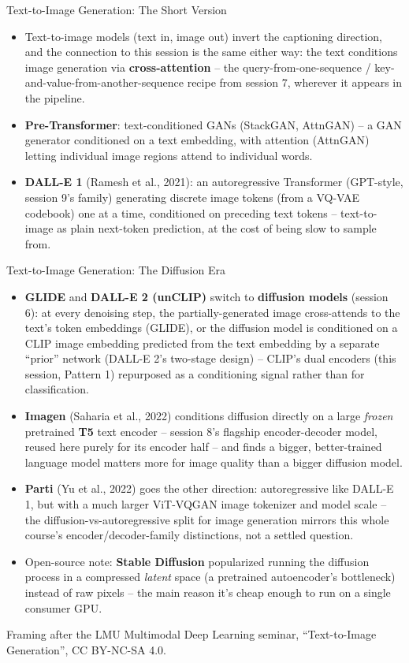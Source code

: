 \begin{vbframe}{Text-to-Image Generation: The Short Version}
\begin{itemize}
  \item Text-to-image models (text in, image out) invert the captioning direction, and the connection to this session is the same either way: the text conditions image generation via \textbf{cross-attention} -- the query-from-one-sequence / key-and-value-from-another-sequence recipe from session 7, wherever it appears in the pipeline.
  \item \textbf{Pre-Transformer}: text-conditioned GANs (StackGAN, AttnGAN) -- a GAN generator conditioned on a text embedding, with attention (AttnGAN) letting individual image regions attend to individual words.
  \item \textbf{DALL-E 1} (Ramesh et al., 2021): an autoregressive Transformer (GPT-style, session 9's family) generating discrete image tokens (from a VQ-VAE codebook) one at a time, conditioned on preceding text tokens -- text-to-image as plain next-token prediction, at the cost of being slow to sample from.
\end{itemize}
\end{vbframe}

\begin{vbframe}{Text-to-Image Generation: The Diffusion Era}
\begin{itemize}
  \item \textbf{GLIDE} and \textbf{DALL-E 2 (unCLIP)} switch to \textbf{diffusion models} (session 6): at every denoising step, the partially-generated image cross-attends to the text's token embeddings (GLIDE), or the diffusion model is conditioned on a CLIP image embedding predicted from the text embedding by a separate ``prior'' network (DALL-E 2's two-stage design) -- CLIP's dual encoders (this session, Pattern 1) repurposed as a conditioning signal rather than for classification.
  \item \textbf{Imagen} (Saharia et al., 2022) conditions diffusion directly on a large \emph{frozen} pretrained \textbf{T5} text encoder -- session 8's flagship encoder-decoder model, reused here purely for its encoder half -- and finds a bigger, better-trained language model matters more for image quality than a bigger diffusion model.
  \item \textbf{Parti} (Yu et al., 2022) goes the other direction: autoregressive like DALL-E 1, but with a much larger ViT-VQGAN image tokenizer and model scale -- the diffusion-vs-autoregressive split for image generation mirrors this whole course's encoder/decoder-family distinctions, not a settled question.
  \item Open-source note: \textbf{Stable Diffusion} popularized running the diffusion process in a compressed \emph{latent} space (a pretrained autoencoder's bottleneck) instead of raw pixels -- the main reason it's cheap enough to run on a single consumer GPU.
\end{itemize}
{\footnotesize Framing after the LMU Multimodal Deep Learning seminar, \enquote{Text-to-Image Generation}, CC BY-NC-SA 4.0.}
\end{vbframe}

